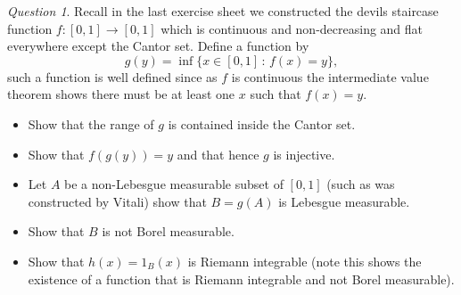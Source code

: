 \documentclass[11pt]{article}
\theoremstyle{definition}
\theoremstyle{remark}
\newtheorem{q}{Question}
\begin{document}
\begin{q}
Recall in the last exercise sheet we constructed the devils staircase function $f: [0,1] \rightarrow [0,1]$ which is continuous and non-decreasing and flat everywhere except the Cantor set. Define a function by
\[ g(y) = \inf\{ x \in [0,1] \,:\, f(x) = y\}, \] such a function is well defined since as $f$ is continuous the intermediate value theorem shows there must be at least one $x$ such that $f(x) = y$. 
\begin{itemize}
\item Show that the range of $g$ is contained inside the Cantor set.
\item Show that $f(g(y)) = y$ and that hence $g$ is injective. 
\item Let $A$ be a non-Lebesgue measurable subset of $[0,1]$ (such as was constructed by Vitali) show that $B = g(A)$ is Lebesgue measurable.
\item Show that $B$ is not Borel measurable. 
\item Show that $h(x) = 1_B(x)$ is Riemann integrable (note this shows the existence of a function that is Riemann integrable and not Borel measurable). 
\end{itemize}
\end{q}
\end{document}
